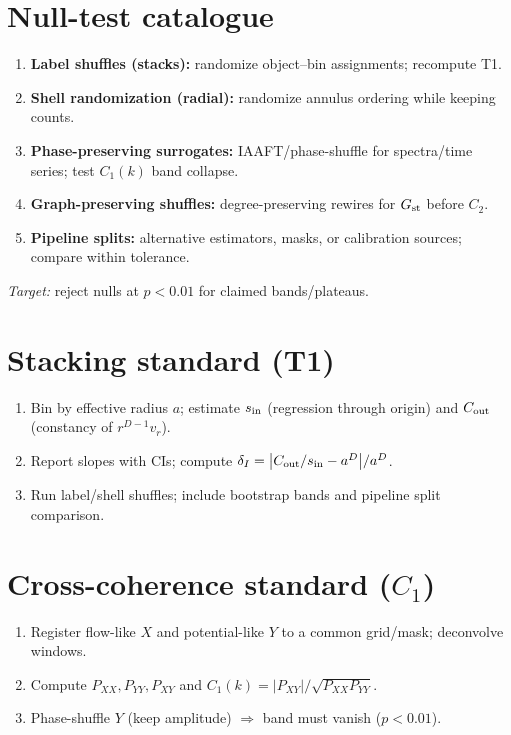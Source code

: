 \documentclass[12pt,a4paper,oneside]{scrreprt}
\begin{document}
\section*{Null-test catalogue}
\begin{enumerate}
\item \textbf{Label shuffles (stacks):} randomize object–bin assignments; recompute T1.
\item \textbf{Shell randomization (radial):} randomize annulus ordering while keeping counts.
\item \textbf{Phase-preserving surrogates:} IAAFT/phase-shuffle for spectra/time series; test $C_1(k)$ band collapse.
\item \textbf{Graph-preserving shuffles:} degree-preserving rewires for $G_{\rm st}$ before $C_2$.
\item \textbf{Pipeline splits:} alternative estimators, masks, or calibration sources; compare within tolerance.
\end{enumerate}
\emph{Target:} reject nulls at $p<0.01$ for claimed bands/plateaus.

\section*{Stacking standard (T1)}
\begin{enumerate}
\item Bin by effective radius $a$; estimate $s_{\rm in}$ (regression through origin) and $C_{\rm out}$ (constancy of $r^{D-1}v_r$).
\item Report slopes with CIs; compute $\delta_I=\big|C_{\rm out}/s_{\rm in}-a^D\big|/a^D$.
\item Run label/shell shuffles; include bootstrap bands and pipeline split comparison.
\end{enumerate}

\section*{Cross-coherence standard ($C_1$)}
\begin{enumerate}
\item Register flow-like $X$ and potential-like $Y$ to a common grid/mask; deconvolve windows.
\item Compute $P_{XX},P_{YY},P_{XY}$ and $C_1(k)=|P_{XY}|/\sqrt{P_{XX}P_{YY}}$.
\item Phase-shuffle $Y$ (keep amplitude) $\Rightarrow$ band must vanish ($p<0.01$).
\end{enumerate}
\end{document}
